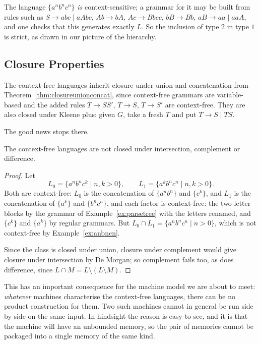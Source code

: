 \begin{remark}
	The language $\{a^nb^nc^n\}$ \emph{is} context-sensitive; a grammar for it may be built from rules such as $S \to abc \mid aAbc$, $Ab \to bA$, $Ac \to Bbcc$, $bB \to Bb$, $aB \to aa \mid aaA$, and one checks that this generates exactly $L$. So the inclusion of type $2$ in type $1$ is strict, as drawn in our picture of the hierarchy.
\end{remark}

\subsection{Closure Properties}

The context-free languages inherit closure under union and concatenation from Theorem~\ref{thm:closureunionconcat}, since context-free grammars are variable-based and the added rules $T \to SS'$, $T \to S$, $T \to S'$ are context-free. They are also closed under Kleene plus: given $G$, take a fresh $T$ and put $T \to S \mid TS$.

The good news stops there.

\begin{proposition}\label{prop:cfnotintersection}
	The context-free languages are not closed under intersection, complement or difference.
\end{proposition}

\begin{proof}
	Let
	$$L_0 = \{a^nb^nc^k \mid n,k > 0\}, \qquad L_1 = \{a^kb^nc^n \mid n,k > 0\}.$$
	Both are context-free: $L_0$ is the concatenation of $\{a^nb^n\}$ and $\{c^k\}$, and $L_1$ is the concatenation of $\{a^k\}$ and $\{b^nc^n\}$, and each factor is context-free: the two-letter blocks by the grammar of Example~\ref{ex:parsetree} with the letters renamed, and $\{c^k\}$ and $\{a^k\}$ by regular grammars. But $L_0 \cap L_1 = \{a^nb^nc^n \mid n > 0\}$, which is not context-free by Example~\ref{ex:anbncn}.

	Since the class is closed under union, closure under complement would give closure under intersection by De Morgan; so complement fails too, as does difference, since $L \cap M = L \setminus (L \setminus M)$.
\end{proof}

This has an important consequence for the machine model we are about to meet: \emph{whatever} machines characterise the context-free languages, there can be no product construction for them. Two such machines cannot in general be run side by side on the same input. In hindsight the reason is easy to see, and it is that the machine will have an unbounded memory, so the pair of memories cannot be packaged into a single memory of the same kind.

